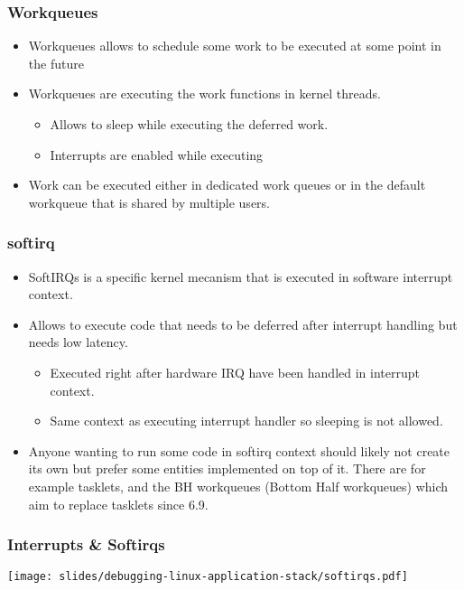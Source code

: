 \begin{frame}
  \frametitle{Workqueues}
  \begin{itemize}
    \item Workqueues allows to schedule some work to be executed at some point
          in the future
    \item Workqueues are executing the work functions in kernel threads.
    \begin{itemize}
      \item Allows to sleep while executing the deferred work.
      \item Interrupts are enabled while executing
    \end{itemize}
    \item Work can be executed either in dedicated work queues or in the
          default workqueue that is shared by multiple users.
  \end{itemize}
\end{frame}

\begin{frame}
  \frametitle{softirq}
  \begin{itemize}
    \item SoftIRQs is a specific kernel mecanism that is executed in
          software interrupt context.
    \item Allows to execute code that needs to be deferred after interrupt
          handling but needs low latency.
    \begin{itemize}
      \item Executed right after hardware IRQ have been handled in interrupt
            context.
      \item Same context as executing interrupt handler so sleeping is not
            allowed.
    \end{itemize}
    \item Anyone wanting to run some code in softirq context should likely not
    create its own but prefer some entities implemented on top of it. There are
    for example tasklets, and the BH workqueues (Bottom Half workqueues) which
    aim to replace tasklets since 6.9.
  \end{itemize}
\end{frame}

\begin{frame}
  \frametitle{Interrupts \& Softirqs}
  \texttt{[image: slides/debugging-linux-application-stack/softirqs.pdf]}
\end{frame}


